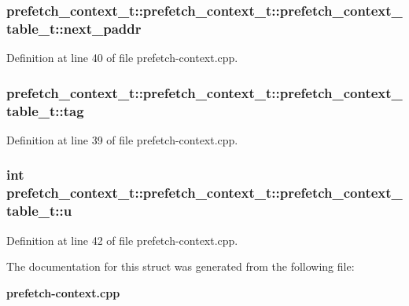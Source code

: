 \subsubsection[{next\_\-paddr}]{ prefetch\_\-context\_\-t::prefetch\_\-context\_\-t::prefetch\_\-context\_\-table\_\-t::next\_\-paddr}\label{structprefetch__context__t_1_1prefetch__context__table__t_4658ee44a89eb06618d481ec4438756d}




Definition at line 40 of file prefetch-context.cpp.
\subsubsection[{tag}]{ prefetch\_\-context\_\-t::prefetch\_\-context\_\-t::prefetch\_\-context\_\-table\_\-t::tag}\label{structprefetch__context__t_1_1prefetch__context__table__t_f3f9ff52938fdc83ab948f698649ee04}




Definition at line 39 of file prefetch-context.cpp.
\subsubsection[{u}]{\setlength{\rightskip}{0pt plus 5cm}int prefetch\_\-context\_\-t::prefetch\_\-context\_\-t::prefetch\_\-context\_\-table\_\-t::u}\label{structprefetch__context__t_1_1prefetch__context__table__t_279d0ce71c77363d1492d18abc5e0517}




Definition at line 42 of file prefetch-context.cpp.

The documentation for this struct was generated from the following file:\begin{CompactItemize}
\item 
{\bf prefetch-context.cpp}\end{CompactItemize}
